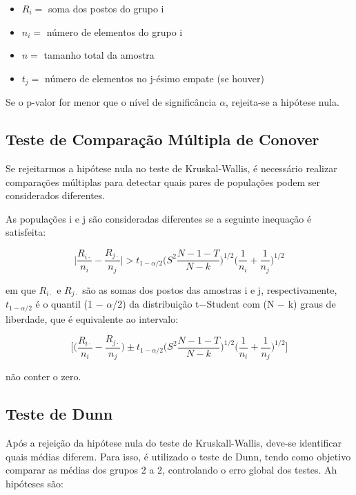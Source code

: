 \documentclass[
  portuguese,
]{estat/estat}
\begin{document}
\begin{itemize}
\item
  \(R_i=\) soma dos postos do grupo i
\item
  \(n_i=\) número de elementos do grupo i
\item
  \(n=\) tamanho total da amostra
\item
  \(t_{j}=\) número de elementos no j-ésimo empate (se houver)
\end{itemize}

Se o p-valor for menor que o nível de significância \(\alpha\),
rejeita-se a hipótese nula.

\subsection{Teste de Comparação Múltipla de
Conover}\label{teste-de-comparauxe7uxe3o-muxfaltipla-de-conover}

Se rejeitarmos a hipótese nula no teste de Kruskal-Wallis, é necessário
realizar comparações múltiplas para detectar quais pares de populações
podem ser considerados diferentes.

As populações i e j são consideradas diferentes se a seguinte inequação
é satisfeita:

\[\bigg | \frac{R_{i\cdot}}{n_i} - \frac{R_{j\cdot}}{n_j} \bigg | > t_{1-\alpha/2} \bigg ( S^2 \frac{N-1-T}{N-k} \bigg ) ^{1/2} \bigg ( \frac{1}{n_i} + \frac{1}{n_j} \bigg )^{1/2}\]

em que \(R_{i\cdot}\) e \(R_{j\cdot}\) são as somas dos postos das
amostras i e j, respectivamente, \(t_{1−\alpha/2}\) é o quantil (1 −
\(\alpha\)/2) da distribuição t−Student com (N − k) graus de liberdade,
que é equivalente ao intervalo:

\[\bigg [ \bigg ( \frac{R_{i\cdot}}{n_i} - \frac{R_{j\cdot}}{n_j} \bigg )   \pm t_{1-\alpha/2} \bigg ( S^2 \frac{N-1-T}{N-k} \bigg ) ^{1/2} \bigg ( \frac{1}{n_i} + \frac{1}{n_j} \bigg )^{1/2} \bigg ]\]

não conter o zero.

\subsection{Teste de Dunn}\label{teste-de-dunn}

Após a rejeição da hipótese nula do teste de Kruskall-Wallis, deve-se
identificar quais médias diferem. Para isso, é utilizado o teste de
Dunn, tendo como objetivo comparar as médias dos grupos 2 a 2,
controlando o erro global dos testes. Ah hipóteses são:
\end{document}
